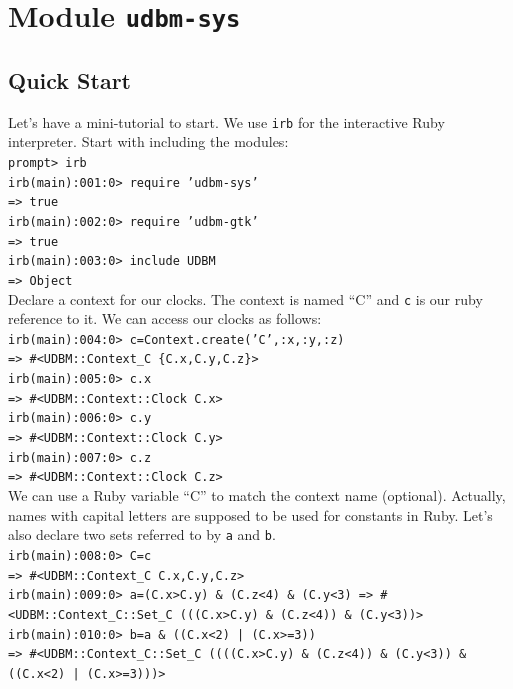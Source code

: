 \documentclass[a4paper]{report}
\begin{document}
\section{Module {\tt udbm-sys}}

\subsection{Quick Start}
\label{QUICK}
Let's have a mini-tutorial to start. We use {\tt irb} for the
interactive Ruby interpreter. Start with including the modules:\\
\newline
{\tt prompt> irb\\
irb(main):001:0> require 'udbm-sys'\\
=> true\\
irb(main):002:0> require 'udbm-gtk'\\
=> true\\
irb(main):003:0> include UDBM\\
=> Object}\\
\newline
Declare a context for our clocks. The context is named ``C'' and {\tt c}
is our ruby reference to it. We can access our clocks as follows:\\
\newline
{\tt  irb(main):004:0> c=Context.create('C',:x,:y,:z)\\
=> \#<UDBM::Context\_C \{C.x,C.y,C.z\}>\\
irb(main):005:0> c.x\\
=> \#<UDBM::Context::Clock C.x>\\
irb(main):006:0> c.y\\
=> \#<UDBM::Context::Clock C.y>\\
irb(main):007:0> c.z\\
=> \#<UDBM::Context::Clock C.z>}\\
\newline
We can use a Ruby variable ``C'' to match the context name
(optional). Actually, names with capital letters are supposed to be
used for constants in Ruby. Let's also declare two sets referred to by
{\tt a} and {\tt b}.\\
\newline
{\tt irb(main):008:0> C=c\\
=> \#<UDBM::Context\_C {C.x,C.y,C.z}>\\
irb(main):009:0> a=(C.x>C.y) \& (C.z<4) \& (C.y<3)
=> \#<UDBM::Context\_C::Set\_C (((C.x>C.y) \& (C.z<4)) \& (C.y<3))>\\
irb(main):010:0> b=a \& ((C.x<2) | (C.x>=3))\\
=> \#<UDBM::Context\_C::Set\_C ((((C.x>C.y) \& (C.z<4)) \& (C.y<3)) \&
((C.x<2) | (C.x>=3)))>}\\
\end{document}
